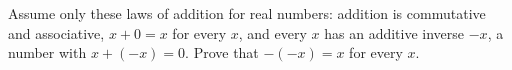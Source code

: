 Assume only these laws of addition for real numbers: addition is commutative and associative, $x+0=x$ for every $x$, and every $x$ has an additive inverse $-x$, a number with $x+(-x)=0$. Prove that $-(-x)=x$ for every $x$.
